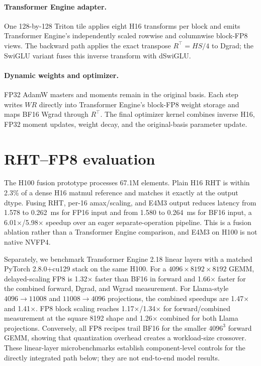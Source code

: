 \documentclass{article}
\begin{document}
\paragraph{Transformer Engine adapter.}
One 128-by-128 Triton tile applies eight H16 transforms per block and emits
Transformer Engine's independently scaled rowwise and columnwise block-FP8
views. The backward path applies the exact transpose $R^\top=HS/4$ to Dgrad;
the SwiGLU variant fuses this inverse transform with dSwiGLU.

\paragraph{Dynamic weights and optimizer.}
FP32 AdamW masters and moments remain in the original basis. Each step writes
$WR$ directly into Transformer Engine's block-FP8 weight storage and maps BF16
Wgrad through $R^\top$. The final optimizer kernel combines inverse H16, FP32
moment updates, weight decay, and the original-basis parameter update.

\section{RHT--FP8 evaluation}
\label{sec:rht-results}


The H100 fusion prototype processes 67.1M elements. Plain H16 RHT is
within 2.3\% of a dense H16 matmul reference and matches it exactly at the
output dtype. Fusing RHT, per-16 amax/scaling, and E4M3 output reduces latency
from 1.578 to 0.262~ms for FP16 input and from 1.580 to 0.264~ms for BF16 input,
a 6.01$\times$/5.98$\times$ speedup over an eager separate-operation pipeline.
This is a fusion ablation rather than a Transformer Engine comparison, and
E4M3 on H100 is not native NVFP4.

Separately, we benchmark Transformer Engine 2.18 linear layers with a matched
PyTorch 2.8.0+cu129 stack on the same H100. For a
$4096\times8192\times8192$ GEMM, delayed-scaling FP8 is 1.32$\times$ faster
than BF16 in forward and 1.66$\times$ faster for the
combined forward, Dgrad, and Wgrad measurement. For Llama-style
$4096\rightarrow11008$ and $11008\rightarrow4096$ projections, the combined
speedups are 1.47$\times$ and 1.41$\times$. FP8 block scaling reaches
1.17$\times$/1.34$\times$ for forward/combined measurement at the square
8192 shape and 1.26$\times$ combined for both Llama projections. Conversely,
all FP8 recipes trail BF16 for the smaller $4096^3$ forward GEMM, showing that
quantization overhead creates a workload-size crossover. These linear-layer
microbenchmarks establish component-level controls for the directly integrated
path below; they are not end-to-end model results.
\end{document}

